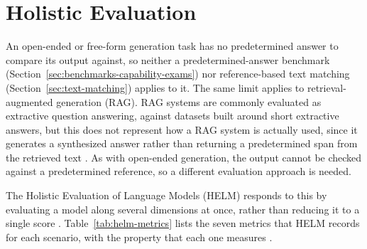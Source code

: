 \section{Holistic Evaluation}
\label{sec:holistic-evaluation}

An open-ended or free-form generation task has no predetermined answer to compare its output against, so neither a predetermined-answer benchmark (Section~\ref{sec:benchmarks-capability-exams}) nor reference-based text matching (Section~\ref{sec:text-matching}) applies to it. The same limit applies to retrieval-augmented generation (RAG). RAG systems are commonly evaluated as extractive question answering, against datasets built around short extractive answers, but this does not represent how a RAG system is actually used, since it generates a synthesized answer rather than returning a predetermined span from the retrieved text \cite{esRagasAutomatedEvaluation2025}. As with open-ended generation, the output cannot be checked against a predetermined reference, so a different evaluation approach is needed.

The Holistic Evaluation of Language Models (HELM) responds to this by evaluating a model along several dimensions at once, rather than reducing it to a single score \cite{liangHolisticEvaluationLanguage2023}. Table~\ref{tab:helm-metrics} lists the seven metrics that HELM records for each scenario, with the property that each one measures \cite{liangHolisticEvaluationLanguage2023}.

